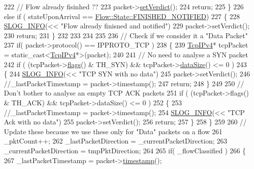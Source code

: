 \begin{DoxyCode}
222         \textcolor{comment}{// Flow already fisinhed ??}
223         packet->\hyperlink{class_vsid_common_1_1_i_pv4_packet_ae314f9e085588928d3c260211f80da87}{setVerdict}();
224         \textcolor{keywordflow}{return};
225     \}
226     \textcolor{keywordflow}{else} \textcolor{keywordflow}{if} ( stateUponArrival == \hyperlink{class_vsid_common_1_1_flow_a4c78d7517903031a861c7287e706a6c2a055b500bb0ed82a58f138a885208507a}{Flow::State::FINISHED\_NOTIFIED})
227     \{
228         \hyperlink{_logger_8h_a119c1c29ba35a8db38e2358e41167282}{SLOG\_INFO}(<< \textcolor{stringliteral}{"Flow already finisned and notified"})
229         packet->setVerdict();
230         return;
231     \}
232 
233 
234 
235 
236     \textcolor{comment}{// Check if we consider it a "Data Packet"}
237     if( packet->protocol() == IPPROTO\_TCP )
238     \{
239         \hyperlink{class_vsid_common_1_1_tcp_i_pv4}{TcpIPv4}* tcpPacket = \textcolor{keyword}{static\_cast<}\hyperlink{class_vsid_common_1_1_tcp_i_pv4}{TcpIPv4}*\textcolor{keyword}{>}(packet);
240 
241         \textcolor{comment}{// No need to analyse a SYN packet}
242         \textcolor{keywordflow}{if} ( (tcpPacket->\hyperlink{class_vsid_common_1_1_tcp_i_pv4_adb5c52a0772cf3bd53c41702b877b7d1}{flags}() & TH\_SYN) && tcpPacket->\hyperlink{class_vsid_common_1_1_i_pv4_packet_a39fe36210895625ee87320f5c0c7f52e}{dataSize}() <= 0 )
243         \{
244             \hyperlink{_logger_8h_a119c1c29ba35a8db38e2358e41167282}{SLOG\_INFO}(<< \textcolor{stringliteral}{"TCP SYN with no data"})
245             packet->setVerdict();
246             \textcolor{comment}{//\_lastPacketTimestamp = packet->timestamp();}
247             return;
248         \}
249 
250         \textcolor{comment}{// Don't bother to analyse an empty TCP ACK packets}
251         if ( (tcpPacket->flags() & TH\_ACK) && tcpPacket->dataSize() <= 0 )
252         \{
253             \textcolor{comment}{//\_lastPacketTimestamp = packet->timestamp();}
254             \hyperlink{_logger_8h_a119c1c29ba35a8db38e2358e41167282}{SLOG\_INFO}(<< \textcolor{stringliteral}{"TCP Ack with no data"})
255             packet->setVerdict();
256             return;
257         \}
258     \} 
259     
260     \textcolor{comment}{// Update these because we use these only for "Data" packets on a flow}
261     \_pktCount++;
262     \_lastPacketDirection = \_currentPacketDirection;
263     \_currentPacketDirection = tmpPktDirection;
264 
265     if( \_flowClassified )
266     \{
267         \_lastPacketTimestamp = packet->\hyperlink{class_vsid_common_1_1_i_pv4_packet_abef9e70b733c8e5718153cb032ea6f1a}{timestamp}();

\end{DoxyCode}
